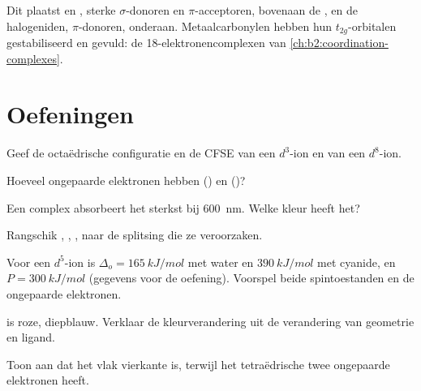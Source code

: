 Dit plaatst  en , sterke $\sigma$-donoren en $\pi$-acceptoren, bovenaan de
, en de halogeniden, $\pi$-donoren, onderaan. Metaalcarbonylen hebben
hun $t_{2g}$-orbitalen gestabiliseerd en gevuld: de 18-elektronencomplexen van
\cref{ch:b2:coordination-complexes}.

\section{Oefeningen}

\begin{exercise}[$\star$]\label{exo:b2:ligand-field:1}
Geef de octaëdrische configuratie en de CFSE van een $d^3$-ion en van een $d^8$-ion.
\end{exercise}

\begin{exercise}[$\star$]\label{exo:b2:ligand-field:2}
Hoeveel ongepaarde elektronen hebben  () en 
()?
\end{exercise}

\begin{exercise}[$\star$]\label{exo:b2:ligand-field:3}
Een complex absorbeert het sterkst bij \qty{600}{nm}. Welke kleur heeft het?
\end{exercise}

\begin{exercise}[$\star$]\label{exo:b2:ligand-field:4}
Rangschik , , ,  naar de splitsing die ze veroorzaken.
\end{exercise}

\begin{exercise}[$\star\star$]\label{exo:b2:ligand-field:5}
Voor een $d^5$-ion is $\Delta_o = \qty{165}{kJ/mol}$ met water en $\qty{390}{kJ/mol}$ met cyanide,
en $P = \qty{300}{kJ/mol}$ (gegevens voor de oefening). Voorspel beide spintoestanden en de ongepaarde
elektronen.
\end{exercise}

\begin{exercise}[$\star\star$]\label{exo:b2:ligand-field:6}
 is roze,  diepblauw. Verklaar de kleurverandering uit de
verandering van geometrie en ligand.
\end{exercise}

\begin{exercise}[$\star\star$]\label{exo:b2:ligand-field:7}
Toon aan dat het vlak vierkante   is, terwijl het tetraëdrische
 twee ongepaarde elektronen heeft.
\end{exercise}

